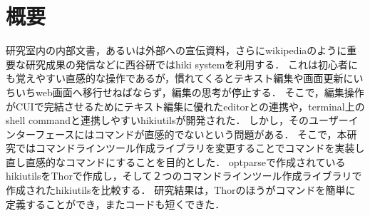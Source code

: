 \section{概要}
研究室内の内部文書，あるいは外部への宣伝資料，さらにwikipediaのように重要な研究成果の発信などに西谷研ではhiki systemを利用する．
これは初心者にも覚えやすい直感的な操作であるが，慣れてくるとテキスト編集や画面更新にいちいちweb画面へ移行せねばならず，編集の思考が停止する．
そこで，編集操作がCUIで完結させるためにテキスト編集に優れたeditorとの連携や，terminal上のshell commandと連携しやすいhikiutilsが開発された．
しかし，そのユーザーインターフェースにはコマンドが直感的でないという問題がある．
そこで，本研究ではコマンドラインツール作成ライブラリを変更することでコマンドを実装し直し直感的なコマンドにすることを目的とした．
optparseで作成されているhikiutilsをThorで作成し，そして２つのコマンドラインツール作成ライブラリで作成されたhikiutilsを比較する．
研究結果は，Thorのほうがコマンドを簡単に定義することができ，またコードも短くできた．

